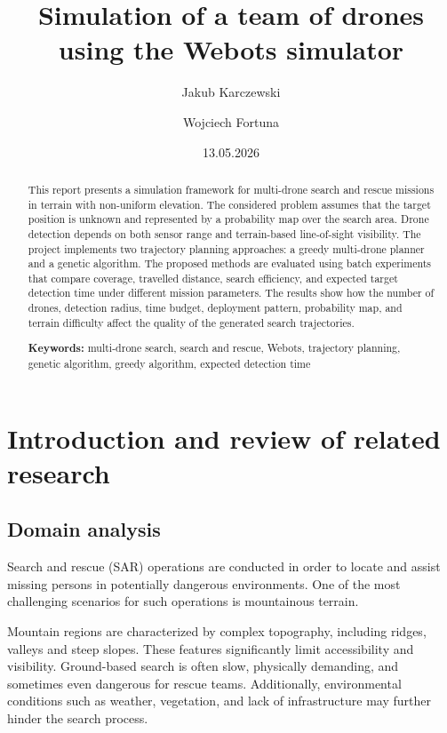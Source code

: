 \documentclass[english]{projectreport}
\author{Jakub Karczewski \and Wojciech Fortuna}
\title{Simulation of a team of drones using the Webots simulator}
\date{13.05.2026}
\begin{document}
\maketitle

\thispagestyle{empty}

  

\begin{abstract}
\noindent
This report presents a simulation framework for multi-drone search and rescue
missions in terrain with non-uniform elevation. The considered problem assumes
that the target position is unknown and represented by a probability map over
the search area. Drone detection depends on both sensor range and terrain-based
line-of-sight visibility. The project implements two trajectory planning
approaches: a greedy multi-drone planner and a genetic algorithm. The proposed
methods are evaluated using batch experiments that compare coverage, travelled
distance, search efficiency, and expected target detection time under different
mission parameters. The results show how the number of drones, detection radius,
time budget, deployment pattern, probability map, and terrain difficulty affect
the quality of the generated search trajectories.

\noindent\textbf{Keywords:} multi-drone search, search and rescue, Webots,
trajectory planning, genetic algorithm, greedy algorithm, expected detection time
\end{abstract}


\section{Introduction and review of related research}

\subsection{Domain analysis}

Search and rescue (SAR) operations are conducted in order to locate and assist
missing persons in potentially dangerous environments. One of the most
challenging scenarios for such operations is mountainous terrain.

Mountain regions are characterized by complex topography, including ridges,
valleys and steep slopes. These features significantly limit accessibility
and visibility. Ground-based search is often slow, physically demanding,
and sometimes even dangerous for rescue teams. Additionally, environmental
conditions such as weather, vegetation, and lack of infrastructure may further
hinder the search process.
\end{document}
